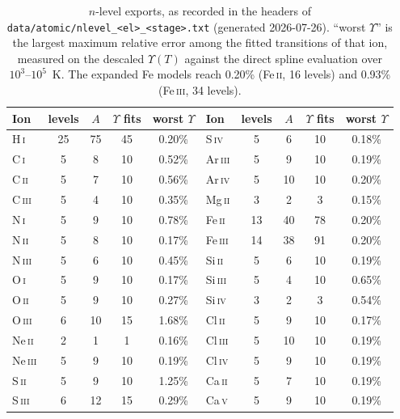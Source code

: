 \documentclass[english,a4paper]{my_memo}
\newcommand{\code}[1]{\texttt{#1}}
\begin{document}
\begin{table}[htb]
\centering
\caption{$n$-level exports, as recorded in the headers of
\code{data/atomic/nlevel\_<el>\_<stage>.txt} (generated 2026-07-26).
``worst $\Upsilon$'' is the largest maximum relative error among the
fitted transitions of that ion, measured on the descaled $\Upsilon(T)$
against the direct spline evaluation over $10^3\mbox{--}10^5$~K.  The
expanded Fe models reach 0.20\% (Fe\,\textsc{ii}, 16 levels) and 0.93\%
(Fe\,\textsc{iii}, 34 levels).}
\label{tab:nlev}
\small
\begin{tabular}{lcccc@{\hspace{2.5em}}lcccc}
\hline
Ion & levels & $A$ & $\Upsilon$ fits & worst $\Upsilon$ &
Ion & levels & $A$ & $\Upsilon$ fits & worst $\Upsilon$ \\
\hline
H\,\textsc{i} & 25 & 75 & 45 & 0.20\% & S\,\textsc{iv} & 5 & 6 & 10 & 0.18\% \\
C\,\textsc{i} & 5 & 8 & 10 & 0.52\% & Ar\,\textsc{iii} & 5 & 9 & 10 & 0.19\% \\
C\,\textsc{ii} & 5 & 7 & 10 & 0.56\% & Ar\,\textsc{iv} & 5 & 10 & 10 & 0.20\% \\
C\,\textsc{iii} & 5 & 4 & 10 & 0.35\% & Mg\,\textsc{ii} & 3 & 2 & 3 & 0.15\% \\
N\,\textsc{i} & 5 & 9 & 10 & 0.78\% & Fe\,\textsc{ii} & 13 & 40 & 78 & 0.20\% \\
N\,\textsc{ii} & 5 & 8 & 10 & 0.17\% & Fe\,\textsc{iii} & 14 & 38 & 91 & 0.20\% \\
N\,\textsc{iii} & 5 & 6 & 10 & 0.45\% & Si\,\textsc{ii} & 5 & 6 & 10 & 0.19\% \\
O\,\textsc{i} & 5 & 9 & 10 & 0.17\% & Si\,\textsc{iii} & 5 & 4 & 10 & 0.65\% \\
O\,\textsc{ii} & 5 & 9 & 10 & 0.27\% & Si\,\textsc{iv} & 3 & 2 & 3 & 0.54\% \\
O\,\textsc{iii} & 6 & 10 & 15 & 1.68\% & Cl\,\textsc{ii} & 5 & 9 & 10 & 0.17\% \\
Ne\,\textsc{ii} & 2 & 1 & 1 & 0.16\% & Cl\,\textsc{iii} & 5 & 10 & 10 & 0.19\% \\
Ne\,\textsc{iii} & 5 & 9 & 10 & 0.19\% & Cl\,\textsc{iv} & 5 & 9 & 10 & 0.19\% \\
S\,\textsc{ii} & 5 & 9 & 10 & 1.25\% & Ca\,\textsc{ii} & 5 & 7 & 10 & 0.19\% \\
S\,\textsc{iii} & 6 & 12 & 15 & 0.29\% & Ca\,\textsc{v} & 5 & 9 & 10 & 0.19\% \\
\hline
\end{tabular}
\end{table}
\end{document}
